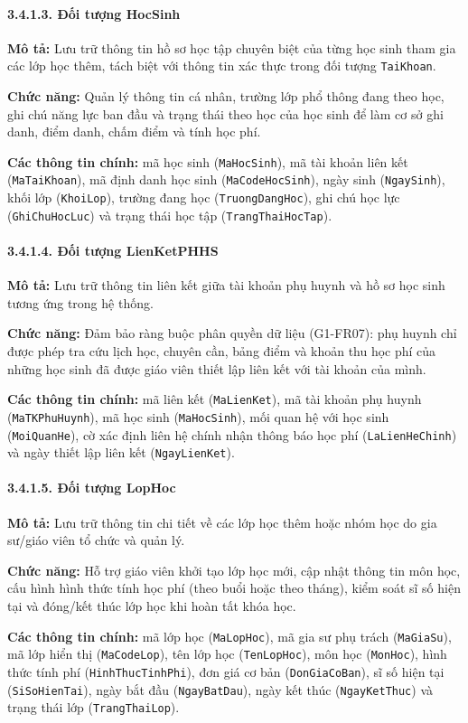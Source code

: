 \documentclass[12pt,a4paper]{article}
\begin{document}
\paragraph{3.4.1.3. Đối tượng HocSinh}\mbox{}\par
\textbf{Mô tả:} Lưu trữ thông tin hồ sơ học tập chuyên biệt của từng học sinh tham gia các lớp học thêm, tách biệt với thông tin xác thực trong đối tượng \texttt{TaiKhoan}.\par
\textbf{Chức năng:} Quản lý thông tin cá nhân, trường lớp phổ thông đang theo học, ghi chú năng lực ban đầu và trạng thái theo học của học sinh để làm cơ sở ghi danh, điểm danh, chấm điểm và tính học phí.\par
\textbf{Các thông tin chính:} mã học sinh (\texttt{MaHocSinh}), mã tài khoản liên kết (\texttt{MaTaiKhoan}), mã định danh học sinh (\texttt{MaCodeHocSinh}), ngày sinh (\texttt{NgaySinh}), khối lớp (\texttt{KhoiLop}), trường đang học (\texttt{TruongDangHoc}), ghi chú học lực (\texttt{GhiChuHocLuc}) và trạng thái học tập (\texttt{TrangThaiHocTap}).

\paragraph{3.4.1.4. Đối tượng LienKetPHHS}\mbox{}\par
\textbf{Mô tả:} Lưu trữ thông tin liên kết giữa tài khoản phụ huynh và hồ sơ học sinh tương ứng trong hệ thống.\par
\textbf{Chức năng:} Đảm bảo ràng buộc phân quyền dữ liệu (G1-FR07): phụ huynh chỉ được phép tra cứu lịch học, chuyên cần, bảng điểm và khoản thu học phí của những học sinh đã được giáo viên thiết lập liên kết với tài khoản của mình.\par
\textbf{Các thông tin chính:} mã liên kết (\texttt{MaLienKet}), mã tài khoản phụ huynh (\texttt{MaTKPhuHuynh}), mã học sinh (\texttt{MaHocSinh}), mối quan hệ với học sinh (\texttt{MoiQuanHe}), cờ xác định liên hệ chính nhận thông báo học phí (\texttt{LaLienHeChinh}) và ngày thiết lập liên kết (\texttt{NgayLienKet}).

\paragraph{3.4.1.5. Đối tượng LopHoc}\mbox{}\par
\textbf{Mô tả:} Lưu trữ thông tin chi tiết về các lớp học thêm hoặc nhóm học do gia sư/giáo viên tổ chức và quản lý.\par
\textbf{Chức năng:} Hỗ trợ giáo viên khởi tạo lớp học mới, cập nhật thông tin môn học, cấu hình hình thức tính học phí (theo buổi hoặc theo tháng), kiểm soát sĩ số hiện tại và đóng/kết thúc lớp học khi hoàn tất khóa học.\par
\textbf{Các thông tin chính:} mã lớp học (\texttt{MaLopHoc}), mã gia sư phụ trách (\texttt{MaGiaSu}), mã lớp hiển thị (\texttt{MaCodeLop}), tên lớp học (\texttt{TenLopHoc}), môn học (\texttt{MonHoc}), hình thức tính phí (\texttt{HinhThucTinhPhi}), đơn giá cơ bản (\texttt{DonGiaCoBan}), sĩ số hiện tại (\texttt{SiSoHienTai}), ngày bắt đầu (\texttt{NgayBatDau}), ngày kết thúc (\texttt{NgayKetThuc}) và trạng thái lớp (\texttt{TrangThaiLop}).
\end{document}
